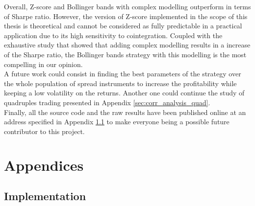 \documentclass[11pt,a4,twosided,singlespacing,titlepagenumber=on]{scrreprt}
\numberwithin{equation}{chapter} %
\theoremstyle{remark}
\begin{document}
Overall, Z-score and Bollinger bands with complex modelling outperform in terms of Sharpe ratio. However, the version of Z-score implemented in the scope of this thesis is theoretical and cannot be considered as fully predictable in a practical application due to its high sensitivity to cointegration. Coupled with the exhaustive study that showed that adding complex modelling results in a increase of the Sharpe ratio, the Bollinger bands strategy with this modelling is the most compelling in our opinion. \\

A future work could consist in finding the best parameters of the strategy over the whole population of spread instruments to increase the profitability while keeping a low volatility on the returns. Another one could continue the study of quadruples trading presented in Appendix \ref{sec:corr_analysis_quad}. \\

Finally, all the source code and the raw results have been published online at an address specified in Appendix \ref{app:implementation} to make everyone being a possible future contributor to this project.

\cleardoublepage
{}
{} %

\begin{spacing}{0.9}
\end{spacing}


\chapter{Appendices}

\section{Implementation}
\label{app:implementation}
\end{document}
